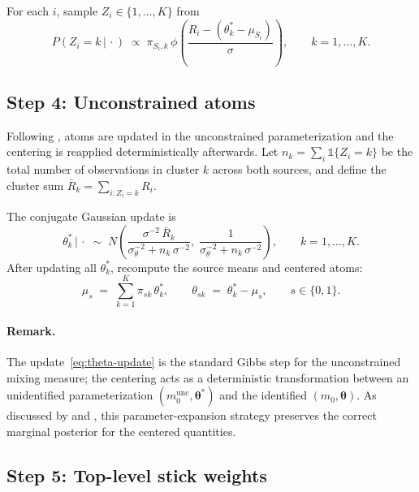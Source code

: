 \documentclass[11pt]{article}
\theoremstyle{plain}
\theoremstyle{definition}
\theoremstyle{remark}
\newcommand{\1}{\mathds{1}}
\newcommand{\given}{\,|\,}
\begin{document}
For each $i$, sample $Z_i \in \{1, \ldots, K\}$ from
\begin{equation}
P(Z_i = k \given \cdot) \;\propto\; \pi_{S_i, k}\, \phi\!\left(\frac{R_i - (\theta_k^* - \mu_{S_i})}{\sigma}\right), \qquad k = 1, \ldots, K.
\end{equation}

\subsection{Step 4: Unconstrained atoms}

Following \citet{henderson2020individualized}, atoms are updated in the unconstrained parameterization and the centering is reapplied deterministically afterwards. Let $n_k = \sum_i \1\{Z_i = k\}$ be the total number of observations in cluster $k$ across both sources, and define the cluster sum $\bar R_k = \sum_{i : Z_i = k} R_i$.

The conjugate Gaussian update is
\begin{equation}
\theta_k^* \given \cdot \;\sim\; N\!\left(\frac{\sigma^{-2}\, \bar R_k}{\sigma_\theta^{-2} + n_k\, \sigma^{-2}},\; \frac{1}{\sigma_\theta^{-2} + n_k\, \sigma^{-2}}\right), \qquad k = 1, \ldots, K.
\label{eq:theta-update}
\end{equation}
After updating all $\theta_k^*$, recompute the source means and centered atoms:
\begin{equation}
\mu_s \;=\; \sum_{k=1}^K \pi_{sk}\, \theta_k^*, \qquad \theta_{sk} \;=\; \theta_k^* - \mu_s, \qquad s \in \{0, 1\}.
\end{equation}

\paragraph{Remark.} The update~\eqref{eq:theta-update} is the standard Gibbs step for the unconstrained mixing measure; the centering acts as a deterministic transformation between an unidentified parameterization $(m_0^{\mathrm{unc}}, \bm{\theta}^*)$ and the identified $(m_0, \bm{\theta})$. As discussed by \citet{yang2010semiparametric} and \citet{henderson2020individualized}, this parameter-expansion strategy preserves the correct marginal posterior for the centered quantities.

\subsection{Step 5: Top-level stick weights}
\end{document}

